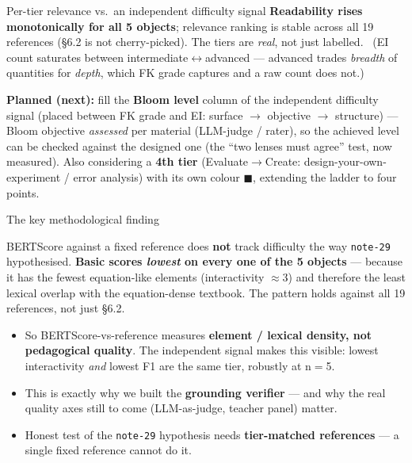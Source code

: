 \documentclass[aspectratio=169,10pt]{beamer}
\newcommand{\hl}[1]{{\bfseries\color{cAccent}#1}}
\begin{document}
\begin{frame}{Per-tier relevance vs.\ an independent difficulty signal}
\textbf{\color{cApp}Readability rises monotonically for all 5 objects}; relevance ranking is stable across
all 19 references (§6.2 is not cherry-picked). The tiers are \emph{real}, not just labelled.
{\footnotesize\ (EI count saturates between intermediate$\leftrightarrow$advanced --- advanced trades
\emph{breadth} of quantities for \emph{depth}, which FK grade captures and a raw count does not.)}
\vspace{0.3em}
\begin{tcolorbox}[colback=cGrey!8,colframe=cGrey,boxsep=1pt,left=4pt,right=4pt]
\tiny \textbf{Planned (next):} fill the \textbf{Bloom level} column of the independent difficulty
signal (placed between FK grade and EI: surface $\rightarrow$ objective $\rightarrow$ structure) ---
Bloom objective \emph{assessed} per material (LLM-judge / rater), so the achieved level can be checked
against the designed one (the ``two lenses must agree'' test, now measured). Also considering a
\textbf{4th tier} (Evaluate$\rightarrow$Create: design-your-own-experiment / error analysis) with its
own colour \textcolor{cExp}{$\blacksquare$}, extending the ladder to four points.
\end{tcolorbox}
\end{frame}

\begin{frame}{The key methodological finding}
\small
\begin{tcolorbox}[colback=cMeas!6,colframe=cMeas,boxsep=2pt,left=5pt,right=5pt]
BERTScore against a fixed reference does \textbf{not} track difficulty the way \texttt{note-29}
hypothesised. \hl{Basic scores \emph{lowest} on every one of the 5 objects} --- because it has the
fewest equation-like elements (interactivity $\approx$3) and therefore the least lexical overlap with the
equation-dense textbook. The pattern holds against all 19 references, not just §6.2.
\end{tcolorbox}
\vspace{0.5em}
\begin{itemize}\setlength\itemsep{3pt}
  \item So BERTScore-vs-reference measures \textbf{element / lexical density, not pedagogical
  quality}. The independent signal makes this visible: lowest interactivity \emph{and} lowest F1
  are the same tier, robustly at n$=$5.
  \item This is exactly why we built the \textbf{grounding verifier} --- and why the real quality
  axes still to come (LLM-as-judge, teacher panel) matter.
  \item Honest test of the \texttt{note-29} hypothesis needs \textbf{tier-matched references} --- a
  single fixed reference cannot do it.
\end{itemize}
\end{frame}
\end{document}
